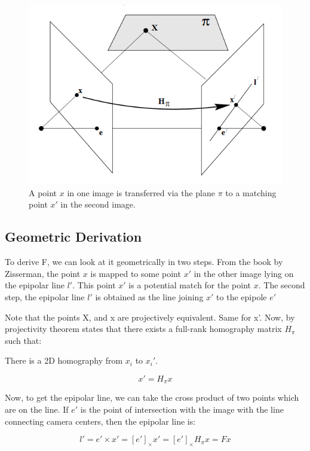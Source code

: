\begin{figure}[h]
    \centering
    \includegraphics[width=12cm]{img/Fundamental_Matrix.png}
    \caption{A point $x$ in one image is transferred via the plane $\pi$ to a matching point $x'$ in the second image.}
    \label{fig:fundamental_image}
\end{figure}

\subsection{Geometric Derivation}

To derive F, we can look at it geometrically in two steps. From the book by Zisserman, the point $x$ is mapped to some point $x'$ in the other image lying on the epipolar line $l'$. This point $x'$ is a potential match for the point $x$. The second step, the epipolar line $l'$ is obtained as the line joining $x'$ to the epipole $e'$

Note that the points X, and x are projectively equivalent. Same for x'. Now, by projectivity theorem states that there exists a full-rank homography matrix $H_{\pi}$ such that:

There is a 2D homography from $x_i$ to $x_i'$.

\begin{equation}
    x' = H_{\pi}x
\end{equation}

Now, to get the epipolar line, we can take the cross product of two points which are on the line. If $e'$ is the point of intersection with the image with the line connecting camera centers, then the epipolar line is:

\begin{equation*}
    l' = e' \times x'=[e']_{\times} x' = [e']_{\times} H_{\pi}x = Fx
\end{equation*}

